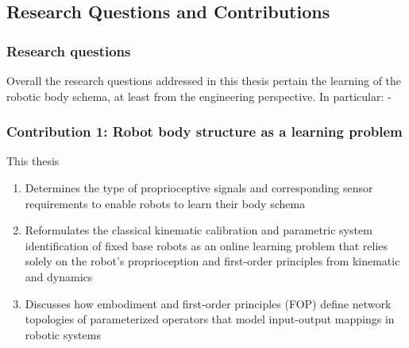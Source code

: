 \documentclass[12pt, a4paper]{article}
\begin{document}
\newpage
	
\pagebreak
\newpage\subsection*{Research Questions and Contributions}

\subsubsection*{Research questions}
Overall the research questions addressed in this thesis pertain the learning of the robotic body schema, at least from the engineering perspective. In particular:
-\begin{shaded}
\end{shaded}
\begin{shaded}
\end{shaded}
\begin{shaded}
\end{shaded}

\subsubsection*{Contribution 1: Robot body structure as a learning problem}
This thesis
\begin{enumerate}
	\item Determines the type of proprioceptive signals and corresponding sensor requirements to enable robots to learn their body schema	
	\item Reformulates the classical kinematic calibration and parametric system identification of fixed base robots as an online learning problem that relies solely on the robot's proprioception and first-order principles from kinematic and dynamics 
	\item Discusses how embodiment and first-order principles (FOP) define network topologies of parameterized operators that model input-output mappings in robotic systems
\end{enumerate}
\end{document}
